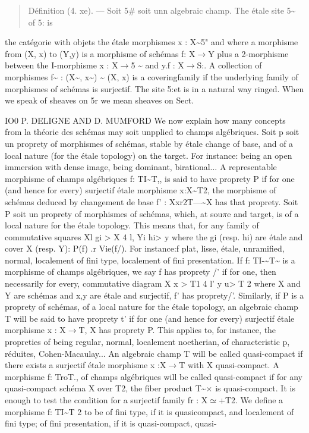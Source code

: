 \documentclass[11pt]{article}
\theoremstyle{plain}
\theoremstyle{definition}
\theoremstyle{remark}
\begin{document}
\begin{quote}D\'efinition (4. xe). --- Soit 5\# soit unn algebraic champ. The \'etale site 5\textasciitilde{} of 5: is\end{quote}
the cat\'egorie with objets the \'etale morphismes x : X\textasciitilde{}5" and where a morphisme from (X, x) to (Y,y) is a morphisme of sch\'emas f: X$\to$Y plus a 2-morphisme between the I-morphisme x : X$\to$5 \textasciitilde{} and y.f : X$\to$S:. A collection of morphismes f\textasciitilde{} : (X\textasciitilde{}, x\textasciitilde{}) \textasciitilde{} (X, x) is a coveringfamily if the underlying family of morphismes of sch\'emas is surjectif. The site 5:et is in a natural way ringed. When we speak of sheaves on 5r we mean sheaves on Sect.

IO0 P. DELIGNE AND D. MUMFORD We now explain how many concepts from la th\'eorie des sch\'emas may soit unpplied to champs alg\'ebriques. Soit p soit un proprety of morphismes of sch\'emas, stable by \'etale change of base, and of a local nature (for the \'etale topology) on the target. For instance: being an open immersion with dense image, being dominant, birational... A representable morphisme of champs alg\'ebriques f: TI\textasciitilde{}T,, is said to have proprety P if for one (and hence for every) surjectif \'etale morphisme x:X\textasciitilde{}T2, the morphisme of sch\'emas deduced by changement de base f' : Xxr2T---\textasciitilde{}X has that proprety. Soit P soit un proprety of morphismes of sch\'emas, which, at sou$\pi$e and target, is of a local nature for the \'etale topology. This means that, for any family of commutative squares Xl gi > X 4 l, Yi hi> y where the gi (resp. hi) are \'etale and cover X (resp. Y): P(f) .r Vie(f/). For instance:f plat, lisse, \'etale, unramified, normal, localement of fini type, localement of fini presentation. If f: TI-\textasciitilde{}T\textasciitilde{} is a morphisme of champs alg\'ebriques, we say f has proprety /' if for one, then necessarily for every, commutative diagram X x > T1 4 l' y u> T 2 where X and Y are sch\'emas and x,y are \'etale and surjectif, f' has proprety/'. Similarly, if P is a proprety of sch\'emas, of a local nature for the \'etale topology, an algebraic champ T will be said to have proprety t' if for one (and hence for every) surjectif \'etale morphisme x : X$\to$T, X has proprety P. This applies to, for instance, the propreties of being regular, normal, localement noetherian, of characteristic p, r\'eduites, Cohen-Macaulay... An algebraic champ T will be called quasi-compact if there exists a surjectif \'etale morphisme x :X$\to$T with X quasi-compact. A morphisme f: TroT., of champs alg\'ebriques will be called quasi-compact if for any quasi-compact sch\'ema X over T2, the fiber product T\textasciitilde{}$\times$ is quasi-compact. It is enough to test the condition for a surjectif family fr : X$\simeq$+T2. We define a morphisme f: TI\textasciitilde{}T 2 to be of fini type, if it is quasicompact, and localement of fini type; of fini presentation, if it is quasi-compact, quasi-
\end{document}
